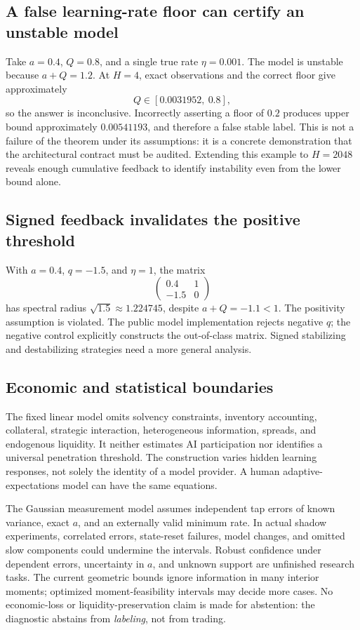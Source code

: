 \documentclass[11pt]{article}
\theoremstyle{remark}\newtheorem{remark}[theorem]{Remark}
\begin{document}
\subsection{A false learning-rate floor can certify an unstable model}
Take $a=0.4$, $Q=0.8$, and a single true rate $\eta=0.001$. The model is unstable because $a+Q=1.2$. At $H=4$, exact observations and the correct floor give approximately
\begin{equation}
 Q\in[0.0031952,\ 0.8],
\end{equation}
so the answer is inconclusive. Incorrectly asserting a floor of $0.2$ produces upper bound approximately $0.00541193$, and therefore a false stable label. This is not a failure of the theorem under its assumptions: it is a concrete demonstration that the architectural contract must be audited. Extending this example to $H=2048$ reveals enough cumulative feedback to identify instability even from the lower bound alone.

\subsection{Signed feedback invalidates the positive threshold}
With $a=0.4$, $q=-1.5$, and $\eta=1$, the matrix
\begin{equation}
 \begin{pmatrix}0.4&1\\-1.5&0\end{pmatrix}
\end{equation}
has spectral radius $\sqrt{1.5}\approx1.224745$, despite $a+Q=-1.1<1$. The positivity assumption is violated. The public model implementation rejects negative $q$; the negative control explicitly constructs the out-of-class matrix. Signed stabilizing and destabilizing strategies need a more general analysis.

\subsection{Economic and statistical boundaries}
The fixed linear model omits solvency constraints, inventory accounting, collateral, strategic interaction, heterogeneous information, spreads, and endogenous liquidity. It neither estimates AI participation nor identifies a universal penetration threshold. The construction varies hidden learning responses, not solely the identity of a model provider. A human adaptive-expectations model can have the same equations.

The Gaussian measurement model assumes independent tap errors of known variance, exact $a$, and an externally valid minimum rate. In actual shadow experiments, correlated errors, state-reset failures, model changes, and omitted slow components could undermine the intervals. Robust confidence under dependent errors, uncertainty in $a$, and unknown support are unfinished research tasks. The current geometric bounds ignore information in many interior moments; optimized moment-feasibility intervals may decide more cases. No economic-loss or liquidity-preservation claim is made for abstention: the diagnostic abstains from \emph{labeling}, not from trading.
\end{document}

